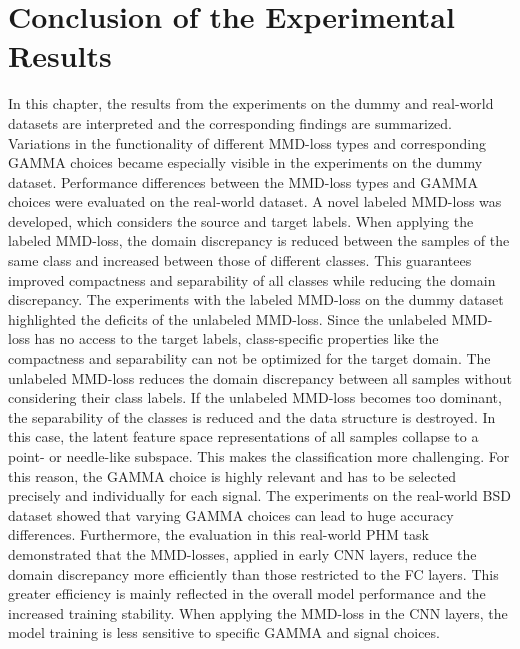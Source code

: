 \section{Conclusion of the Experimental Results}\label{sec:Performance_overview}
In this chapter, the results from the experiments on the dummy and real-world datasets are interpreted and the corresponding findings are summarized. Variations in the functionality of different MMD-loss types and corresponding GAMMA choices became especially visible in the experiments on the dummy dataset. Performance differences between the MMD-loss types and GAMMA choices were evaluated on the real-world dataset. A novel labeled MMD-loss was developed, which considers the source and target labels. When applying the labeled MMD-loss, the domain discrepancy is reduced between the samples of the same class and increased between those of different classes. This guarantees improved compactness and separability of all classes while reducing the domain discrepancy. The experiments with the labeled MMD-loss on the dummy dataset highlighted the deficits of the unlabeled MMD-loss. Since the unlabeled MMD-loss has no access to the target labels, class-specific properties like the compactness and separability can not be optimized for the target domain. The unlabeled MMD-loss reduces the domain discrepancy between all samples without considering their class labels. If the unlabeled MMD-loss becomes too dominant, the separability of the classes is reduced and the data structure is destroyed. In this case, the latent feature space representations of all samples collapse to a point- or needle-like subspace. This makes the classification more challenging. For this reason, the GAMMA choice is highly relevant and has to be selected precisely and individually for each signal. The experiments on the real-world BSD dataset showed that varying GAMMA choices can lead to huge  accuracy differences. Furthermore, the evaluation in this real-world PHM task demonstrated that the MMD-losses, applied in early CNN layers, reduce the domain discrepancy more efficiently than those restricted to the FC layers. This greater efficiency is mainly reflected in the overall model performance and the increased training stability. When applying the MMD-loss in the CNN layers, the model training is less sensitive to specific GAMMA and signal choices. 